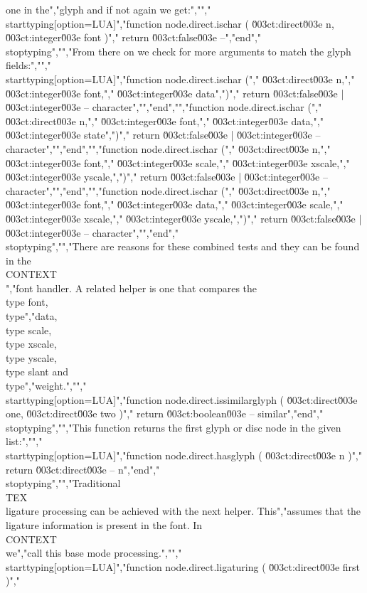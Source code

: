 one in the","glyph and if not again we get:","","\\starttyping[option=LUA]","function node.direct.ischar ( \u003ct:direct\u003e n, \u003ct:integer\u003e font )","    return \u003ct:false\u003e --","end","\\stoptyping","","From there on we check for more arguments to match the glyph fields:","","\\starttyping[option=LUA]","function node.direct.ischar (","    \u003ct:direct\u003e  n,","    \u003ct:integer\u003e font,","    \u003ct:integer\u003e data",")","    return \u003ct:false\u003e | \u003ct:integer\u003e -- character","","end","","function node.direct.ischar (","    \u003ct:direct\u003e  n,","    \u003ct:integer\u003e font,","    \u003ct:integer\u003e data,","    \u003ct:integer\u003e state",")","    return \u003ct:false\u003e | \u003ct:integer\u003e -- character","","end","","function node.direct.ischar (","    \u003ct:direct\u003e  n,","    \u003ct:integer\u003e font,","    \u003ct:integer\u003e scale,","    \u003ct:integer\u003e xscale,","    \u003ct:integer\u003e yscale,",")","    return \u003ct:false\u003e | \u003ct:integer\u003e -- character","","end","","function node.direct.ischar (","    \u003ct:direct\u003e  n,","    \u003ct:integer\u003e font,","    \u003ct:integer\u003e data,","    \u003ct:integer\u003e scale,","    \u003ct:integer\u003e xscale,","    \u003ct:integer\u003e yscale,",")","    return \u003ct:false\u003e | \u003ct:integer\u003e -- character","","end","\\stoptyping","","There are reasons for these combined tests and they can be found in the \\CONTEXT\\","font handler. A related helper is one that compares the \\type {font}, \\type","{data}, \\type {scale}, \\type {xscale}, \\type {yscale}, \\type {slant} and \\type","{weight}.","","\\starttyping[option=LUA]","function node.direct.issimilarglyph ( \u003ct:direct\u003e  one, \u003ct:direct\u003e two )","    return \u003ct:boolean\u003e -- similar","end","\\stoptyping","","This function returns the first glyph or disc node in the given list:","","\\starttyping[option=LUA]","function node.direct.hasglyph ( \u003ct:direct\u003e n )","    return \u003ct:direct\u003e -- n","end","\\stoptyping","","Traditional \\TEX\\ ligature processing can be achieved with the next helper. This","assumes that the ligature information is present in the font. In \\CONTEXT\\ we","call this base mode processing.","","\\starttyping[option=LUA]","function node.direct.ligaturing ( \u003ct:direct\u003e first )","    